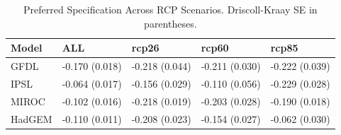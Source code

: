 \begin{table}[ht]
\centering
\begin{tabular}{lllll}
  \hline
Model & ALL & rcp26 & rcp60 & rcp85 \\ 
  \hline
GFDL & -0.170
(0.018) & -0.218
(0.044) & -0.211
(0.030) & -0.222
(0.039) \\ 
  IPSL & -0.064
(0.017) & -0.156
(0.029) & -0.110
(0.056) & -0.229
(0.028) \\ 
  MIROC & -0.102
(0.016) & -0.218
(0.019) & -0.203
(0.028) & -0.190
(0.018) \\ 
  HadGEM & -0.110
(0.011) & -0.208
(0.023) & -0.154
(0.027) & -0.062
(0.030) \\ 
   \hline
\end{tabular}
\caption{Preferred Specification Across RCP Scenarios. Driscoll-Kraay SE in parentheses.} 
\label{tab:rcp_results}
\end{table}
